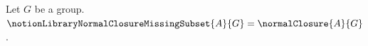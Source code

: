 

\begin{definition}\label{notion_library_normal_closure_missing_subset}
    Let $G$ be a group.
    $\notionLibraryNormalClosureMissingSubset{A}{G}=\normalClosure{A}{G}$.
\end{definition}
